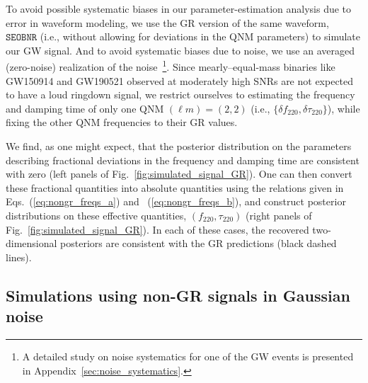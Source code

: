 \documentclass[twocolumn,prd,aps,superscriptaddress,preprintnumbers,tightenlines,showpacs,nofootinbib,eqsecnum,amsfonts,amsmath]{revtex4-1}
\newcommand{\df}[1]{\delta f_{\text{#1}}}
\newcommand{\dtau}[1]{\delta \tau_{\text{#1}}}
\newcommand{\fngr}[1]{f_{\text{#1}}}
\newcommand{\taungr}[1]{\tau_{\text{#1}}}
\newcommand{\SEOB}{\texttt{SEOBNR}}
\begin{document}

To avoid possible systematic biases in our parameter-estimation analysis
due to error in waveform modeling, we use the GR version of the same waveform,
$\SEOB$ (i.e., without allowing for deviations in the QNM parameters) to
simulate our GW signal. And to avoid systematic biases due to noise,
we use an averaged (zero-noise) realization of the noise~\footnote{A detailed
study on noise systematics for one of the GW events is presented in
Appendix~\ref{sec:noise_systematics}.}.  Since mearly--equal-mass binaries like GW150914 and
GW190521 observed at moderately high SNRs are not expected to have a
loud ringdown signal, we restrict ourselves to estimating the
frequency and damping time of only one QNM $(\ell m) = (2,2)$ (i.e.,
$\{\df{220},\dtau{220}\}$), while fixing the other QNM frequencies to
their GR values.

We find, as one might expect, that the posterior distribution on the
parameters describing fractional deviations in the frequency and
damping time are consistent with zero (left panels of
Fig.~\ref{fig:simulated_signal_GR}). One can then convert these
fractional quantities into absolute quantities using the relations
given in Eqs.~(\ref{eq:nongr_freqs_a}) and ~(\ref{eq:nongr_freqs_b}), and
construct posterior distributions on these effective quantities,
$(\fngr{220}, \taungr{220})$ (right panels of
Fig.~\ref{fig:simulated_signal_GR}). In each of these cases, the recovered
two-dimensional posteriors are consistent with the GR predictions
(black dashed lines).


\subsection{Simulations using non-GR signals in Gaussian noise} \label{ssec:ngr_signal}
\end{document}
